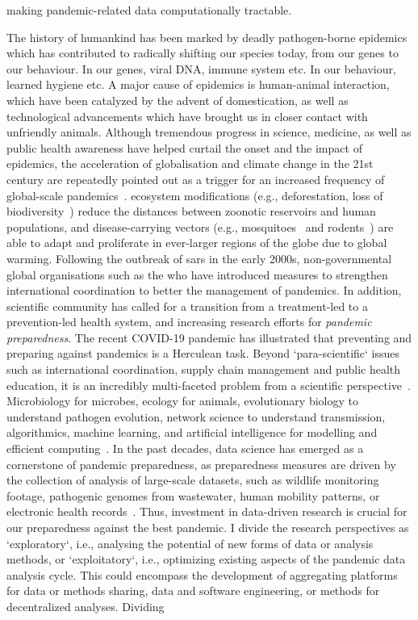
making pandemic-related data computationally tractable.

The history of humankind has been marked by deadly pathogen-borne epidemics which has contributed to radically shifting our species today, from our genes to our behaviour. In our genes, viral DNA, immune system etc. In our behaviour, learned hygiene etc. A major cause of epidemics is human-animal interaction, which have been catalyzed by the advent of domestication, as well as technological advancements which have brought us in closer contact with unfriendly animals. Although tremendous progress in science, medicine, as well as public health awareness have helped curtail the onset and the impact of epidemics, the acceleration of globalisation and climate change in the 21st century are repeatedly pointed out as a trigger for an increased frequency of global-scale pandemics~\cite{marani2021}. ecosystem modifications (e.g., deforestation, loss of biodiversity~\cite{keesing2010}) reduce the distances between zoonotic reservoirs and human populations, and disease-carrying vectors (e.g., mosquitoes~\cite{jones2008, ryan2019} and rodents~\cite{johnson2020}) are able to adapt and proliferate in ever-larger regions of the globe due to global warming. Following the outbreak of \gls{sars} in the early 2000s, non-governmental global organisations such as the \gls{who} have introduced measures to strengthen international coordination to better the management of pandemics. In addition, scientific community has called for a transition from a treatment-led to a prevention-led health system, and increasing research efforts for \emph{pandemic preparedness}. The recent COVID-19 pandemic has illustrated that preventing and preparing against pandemics is a Herculean task. Beyond `para-scientific` issues such as international coordination, supply chain management and public health education, it is an incredibly multi-faceted problem from a scientific perspective~\cite{williams2023}. Microbiology for microbes, ecology for animals, evolutionary biology to understand pathogen evolution, network science to understand transmission, algorithmics, machine learning, and artificial intelligence for modelling and efficient computing~\cite{kraemer2025}. In the past decades, data science has emerged as a cornerstone of pandemic preparedness, as preparedness measures are driven by the collection of analysis of large-scale datasets, such as wildlife monitoring footage, pathogenic genomes from wastewater, human mobility patterns, or electronic health records~\cite{grenfell2004, khurana2024}. Thus, investment in data-driven research is crucial for our preparedness against the best pandemic. I divide the research perspectives as `exploratory`, i.e., analysing the potential of new forms of data or analysis methods, or `exploitatory`, i.e., optimizing existing aspects of the pandemic data analysis cycle. This could encompass the development of aggregating platforms for data or methods sharing, data and software engineering, or methods for decentralized analyses. Dividing

